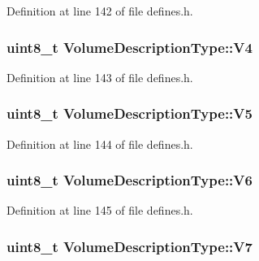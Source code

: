 Definition at line 142 of file defines.\-h.

\hypertarget{structVolumeDescriptionType_ad10e9650afd43567c2b3b709d72f5dec}{
\subsubsection[{V4}]{\setlength{\rightskip}{0pt plus 5cm}uint8\-\_\-t Volume\-Description\-Type\-::\-V4}}\label{structVolumeDescriptionType_ad10e9650afd43567c2b3b709d72f5dec}


Definition at line 143 of file defines.\-h.

\hypertarget{structVolumeDescriptionType_a986e346428396e0c131a9f200f472716}{
\subsubsection[{V5}]{\setlength{\rightskip}{0pt plus 5cm}uint8\-\_\-t Volume\-Description\-Type\-::\-V5}}\label{structVolumeDescriptionType_a986e346428396e0c131a9f200f472716}


Definition at line 144 of file defines.\-h.

\hypertarget{structVolumeDescriptionType_a3f925228651ced5c0e7c373ec6573162}{
\subsubsection[{V6}]{\setlength{\rightskip}{0pt plus 5cm}uint8\-\_\-t Volume\-Description\-Type\-::\-V6}}\label{structVolumeDescriptionType_a3f925228651ced5c0e7c373ec6573162}


Definition at line 145 of file defines.\-h.

\hypertarget{structVolumeDescriptionType_a5d057bc3e9f6537234dfb904c740c68f}{
\subsubsection[{V7}]{\setlength{\rightskip}{0pt plus 5cm}uint8\-\_\-t Volume\-Description\-Type\-::\-V7}}\label{structVolumeDescriptionType_a5d057bc3e9f6537234dfb904c740c68f}


